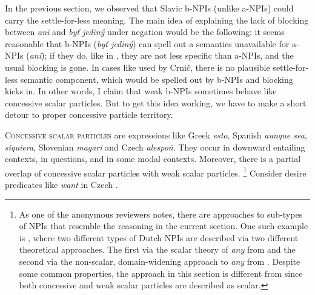\documentclass[output=paper,colorlinks,citecolor=brown]{langscibook}
\begin{document}
In the previous section, we observed that Slavic b-NPIs (unlike a-NPIs) could carry the settle-for-less meaning. The main idea of explaining the lack of blocking between \emph{ani} and \emph{byť jediný} under negation would be the following: it seems reasonable that b-NPIs (\emph{byť jediný}) can spell out a semantics unavailable for a-NPIs (\emph{ani}); if they do, like in , they are not less specific than a-NPIs, and the usual blocking is gone. In cases like  used by Crnič, there is no plausible settle-for-less semantic component, which would be spelled out by b-NPIs and blocking kicks in. In other words, I claim that weak b-NPIs sometimes behave like concessive scalar particles. But to get this idea working, we have to make a short detour to proper concessive particle territory.

\textsc{Concessive scalar particles} are expressions like Greek \emph{esto}, Spanish \emph{aunque sea}, \emph{siquiera}, Slovenian \emph{magari} and Czech \emph{alespoň}. They occur in downward entailing contexts, in questions, and in some modal contexts. Moreover, there is a partial overlap of concessive scalar particles with weak scalar particles.%
\footnote{As one of the anonymous reviewers notes, there are approaches to sub-types of NPIs that resemble the reasoning in the current section. One such example is \citet{rullmann_two_1996}, where two different types of Dutch NPIs are described via two different theoretical approaches. The first via the scalar theory of \textit{any} from \citet{lee_any_1994} and the second via the non-scalar, domain-widening approach to \textit{any} from \citet{kadmon1993any}. Despite some common properties, the approach in this section is different from \citet{rullmann_two_1996} since both concessive and weak scalar particles are described as scalar.}
Consider desire predicates like \emph{want} in Czech .
\end{document}
